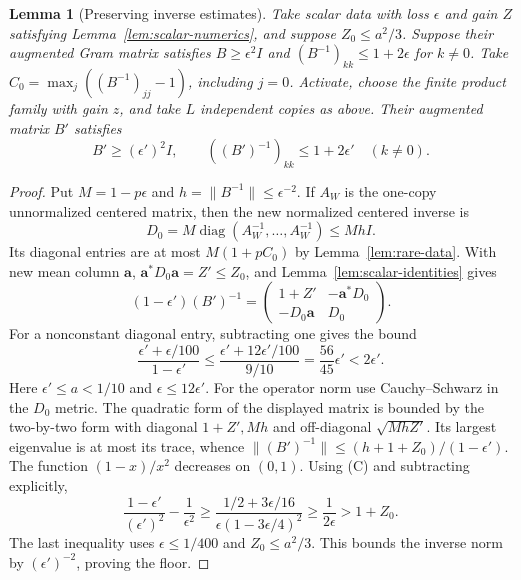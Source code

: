 \documentclass[reqno,a4paper,12pt]{amsart}
\newtheorem{lemma}[theorem]{Lemma}
\theoremstyle{definition}
\newcommand{\diag}{\operatorname{diag}}
\begin{document}
\begin{lemma}[Preserving inverse estimates]\label{lem:scalar-inverse-step}
Take scalar data with loss $\epsilon$ and gain $Z$ satisfying
Lemma~\ref{lem:scalar-numerics}, and suppose $Z_0\le a^2/3$.
Suppose their augmented Gram matrix satisfies
$B\ge\epsilon^2I$ and
$(B^{-1})_{kk}\le1+2\epsilon$ for $k\ne0$.
Take $C_0=\max_j((B^{-1})_{jj}-1)$, including $j=0$.
Activate, choose the finite product family with gain $z$, and take
$L$ independent copies as above. Their augmented matrix $B'$ satisfies
\[
 B'\ge(\epsilon')^2I,\qquad
 ((B')^{-1})_{kk}\le1+2\epsilon'\quad(k\ne0).
\]
\end{lemma}
\begin{proof}
Put $M=1-p\epsilon$ and $h=\|B^{-1}\|\le\epsilon^{-2}$.
If $A_W$ is the one-copy unnormalized centered matrix, then the
new normalized centered inverse is
\[
 D_0=M\diag(A_W^{-1},\ldots,A_W^{-1})\le MhI.
\]
Its diagonal entries are at most $M(1+pC_0)$ by
Lemma~\ref{lem:rare-data}. With new mean column $\mathbf a$,
$\mathbf a^*D_0\mathbf a=Z'\le Z_0$, and
Lemma~\ref{lem:scalar-identities} gives
\[
 (1-\epsilon')(B')^{-1}
 =\begin{pmatrix}1+Z'&-\mathbf a^*D_0\\-D_0\mathbf a&D_0\end{pmatrix}.
\]
For a nonconstant diagonal entry, subtracting one gives the bound
\[
 \frac{\epsilon'+\epsilon/100}{1-\epsilon'}
 \le\frac{\epsilon'+12\epsilon'/100}{9/10}
 =\frac{56}{45}\epsilon'<2\epsilon'.
\]
Here $\epsilon'\le a<1/10$ and $\epsilon\le12\epsilon'$.
For the operator norm use Cauchy--Schwarz in the $D_0$ metric.
The quadratic form of the displayed matrix is bounded by the
two-by-two form with diagonal $1+Z',Mh$ and off-diagonal
$\sqrt{MhZ'}$. Its largest eigenvalue is at most its trace, whence
$\|(B')^{-1}\|\le(h+1+Z_0)/(1-\epsilon')$.
The function $(1-x)/x^2$ decreases on $(0,1)$.
Using (C) and subtracting explicitly,
\[
 \frac{1-\epsilon'}{(\epsilon')^2}-\frac1{\epsilon^2}
 \ge\frac{1/2+3\epsilon/16}{\epsilon(1-3\epsilon/4)^2}
 \ge\frac1{2\epsilon}>1+Z_0.
\]
The last inequality uses $\epsilon\le1/400$ and $Z_0\le a^2/3$.
This bounds the inverse norm by $(\epsilon')^{-2}$, proving the floor.
\end{proof}
\end{document}
